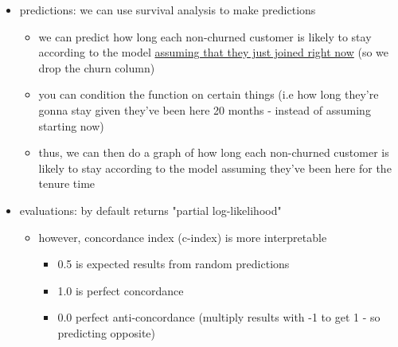 \documentclass[10.5pt,a4paper, fleqn, dvipsnames]{article}
\begin{document}
\begin{itemize}
\begin{itemize}
    \end{itemize}
    \item predictions: we can use survival analysis to make predictions 
    \begin{itemize}
        \item we can predict how long each non-churned customer is likely to stay according to the model \ul{assuming that they just joined right now} (so we drop the churn column)
        \item you can condition the function on certain things (i.e how long they're gonna stay given they've been here 20 months - instead of assuming starting now)
        \item thus, we can then do a graph of how long each non-churned customer is likely to stay according to the model assuming they've been here for the tenure time 
    \end{itemize} 
    \newpage
    \item evaluations: by default returns "partial log-likelihood"
    \begin{itemize}
        \item however, concordance index (c-index) is more interpretable
        \begin{itemize}[leftmargin = 2em]
            \item 0.5 is expected results from random predictions
            \item 1.0 is perfect concordance 
            \item 0.0 perfect anti-concordance (multiply results with -1 to get 1 - so predicting opposite)
        \end{itemize}
    \end{itemize}
\end{itemize}
\end{document}
